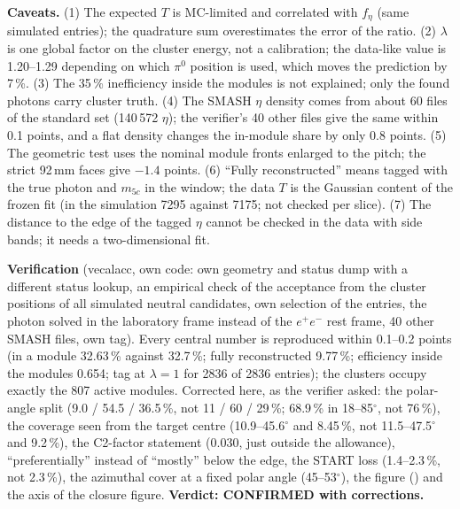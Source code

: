 \documentclass[11pt,a4paper]{article}
\newcommand{\piz}{\ensuremath{\pi^{0}}\xspace}
\newcommand{\ee}{\ensuremath{e^{+}e^{-}}\xspace}
\newcommand{\code}[1]{\texttt{\detokenize{#1}}}
\begin{document}
\textbf{Caveats.} (1) The expected $T$ is MC-limited and correlated with $f_\eta$ (same simulated entries); the quadrature sum overestimates the error of the
ratio. (2) $\lambda$ is one global factor on the cluster energy, not a calibration; the data-like value is 1.20--1.29 depending on which \piz
position is used, which moves the prediction by 7\,\%. (3) The 35\,\% inefficiency inside the modules is not explained; only the found photons
carry cluster truth. (4) The SMASH $\eta$ density comes from about 60 files of the standard set (140\,572 $\eta$); the verifier's 40 other files give
the same within 0.1 points, and a flat density changes the in-module share by only 0.8 points. (5) The geometric test uses the nominal module
fronts enlarged to the pitch; the strict 92\,mm faces give $-1.4$ points. (6) ``Fully reconstructed'' means tagged with the true photon and $m_{5c}$
in the window; the data $T$ is the Gaussian content of the frozen fit (in the simulation 7295 against 7175; not checked per slice). (7) The distance
to the edge of the tagged $\eta$ cannot be checked in the data with side bands; it needs a two-dimensional fit.

\textbf{Verification} (vecalacc, own code: own geometry and status dump with a different status lookup, an empirical check of the acceptance from
the cluster positions of all simulated neutral candidates, own selection of the entries, the photon solved in the laboratory frame instead of the \ee rest
frame, 40 other SMASH files, own tag). Every central number is reproduced within 0.1--0.2 points (in a module 32.63\,\% against 32.7\,\%; fully
reconstructed 9.77\,\%; efficiency inside the modules 0.654; tag at $\lambda=1$ for 2836 of 2836 entries); the clusters occupy exactly the 807 active
modules. Corrected here, as the verifier asked: the polar-angle split (9.0 / 54.5 / 36.5\,\%, not 11 / 60 / 29\,\%; 68.9\,\% in 18--85$^\circ$, not
76\,\%), the coverage seen from the target centre (10.9--45.6$^\circ$ and 8.45\,\%, not 11.5--47.5$^\circ$ and 9.2\,\%), the C2-factor statement (0.030,
just outside the allowance), ``preferentially'' instead of ``mostly'' below the edge, the START loss (1.4--2.3\,\%, not 2.3\,\%), the azimuthal cover at
a fixed polar angle (45--53$^\circ$), the figure (\code{ecalacc_geometry_v2}) and the axis of the closure figure. \textbf{Verdict: CONFIRMED with
corrections.}
\end{document}
